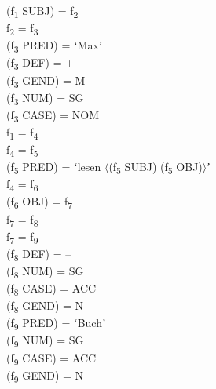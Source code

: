 \ea%
    \label{ex:key:4}
(f\textsubscript{1} SUBJ) = f\textsubscript{2}\\
f\textsubscript{2} = f\textsubscript{3}\\
(f\textsubscript{3} PRED) = ʻMaxʼ\\
(f\textsubscript{3} DEF) = +\\
(f\textsubscript{3} GEND) = M\\
(f\textsubscript{3} NUM) = SG\\
(f\textsubscript{3} CASE) = NOM\\
f\textsubscript{1} = f\textsubscript{4}\\
f\textsubscript{4} = f\textsubscript{5}\\
(f\textsubscript{5} PRED) = ʻlesen $\langle$(f\textsubscript{5} SUBJ) (f\textsubscript{5} OBJ)$\rangle$ʼ\\
f\textsubscript{4} = f\textsubscript{6}\\
(f\textsubscript{6} OBJ) = f\textsubscript{7}\\
f\textsubscript{7} = f\textsubscript{8}\\
f\textsubscript{7} = f\textsubscript{9}\\
(f\textsubscript{8} DEF) = –\\
(f\textsubscript{8} NUM) = SG\\
(f\textsubscript{8} CASE) = ACC\\
(f\textsubscript{8} GEND) = N\\
(f\textsubscript{9} PRED) = ʻBuchʼ\\
(f\textsubscript{9} NUM) = SG\\
(f\textsubscript{9} CASE) = ACC\\
(f\textsubscript{9} GEND) = N\\
\z

